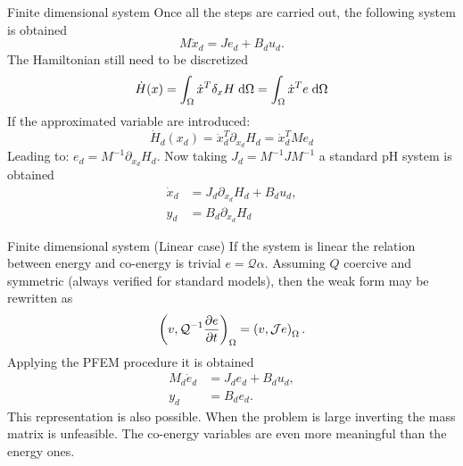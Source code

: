\documentclass[aspectratio=169]{ISAE-Beamer}
\begin{document}
\begin{frame}{Finite dimensional system}
Once all the steps are carried out, the following system is obtained
\begin{equation*}
	M \dot{x}_d = J e_d + B_d u_d.
\end{equation*}
The Hamiltonian still need to be discretized
\begin{equation*}
\dot{H}(x) = \int_{\Omega} \dot{x}^T \delta_x H \d{\Omega} = \int_{\Omega} \dot{x}^T e \d{\Omega}
\end{equation*}
If the approximated variable are introduced:
\begin{equation*}
\dot{H}_d(x_d) = \dot{x}_d^T \partial_{x_d} H_d = \dot{x}_d^T M e_d
\end{equation*}
Leading to: $e_d = M^{-1}\partial_{x_d} H_d$. 
Now taking $J_d = M^{-1} J M^{-1}$ a standard pH system is obtained
\begin{align*}
	\dot{x}_d &= J_d \partial_{x_d} H_d + B_d u_d, \\
	y_d &= B_d \partial_{x_d} H_d
\end{align*}
\end{frame}

\begin{frame}{Finite dimensional system (Linear case)}
If the system is linear the relation between energy and co-energy is trivial $e = \mathcal{Q} \alpha$. Assuming $Q$ coercive and symmetric (always verified for standard models), then the weak form may be rewritten as
\begin{equation*}
\left(v, \mathcal{Q}^{-1} \diffp{e}{t} \right)_{\Omega} = \left(v, \mathcal{J} e \right)_{\Omega}.
\end{equation*}
Applying the PFEM procedure it is obtained
\begin{align*}
M_d \dot{e}_d &= J_d e_d + B_d u_d, \\
y_d &= B_d e_d.
\end{align*}
This representation is also possible. When the problem is large inverting the mass matrix is unfeasible. The co-energy variables are even more meaningful than the energy ones.
\end{frame}
\end{document}
